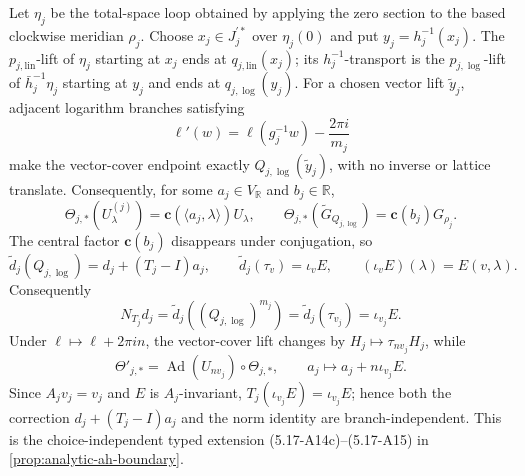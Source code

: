 \begin{auditrecord}
Let $\eta_j$ be the total-space loop obtained by applying the zero section
to the based clockwise meridian $\rho_j$.  Choose
$x_j\in J_j^{\prime *}$ over $\eta_j(0)$ and put $y_j=h_j^{-1}(x_j)$.
The $p_{j,\mathrm{lin}}$-lift of $\eta_j$ starting at $x_j$ ends at
$q_{j,\mathrm{lin}}(x_j)$; its $h_j^{-1}$-transport is the
$p_{j,\log}$-lift of $\bar h_j^{-1}\eta_j$ starting at $y_j$ and ends at
$q_{j,\log}(y_j)$.  For a chosen vector lift $\widetilde y_j$, adjacent
logarithm branches satisfying
\[
 \ell'(w)=\ell(g_j^{-1}w)-\frac{2\pi i}{m_j}
\]
make the vector-cover endpoint exactly
$Q_{j,\log}(\widetilde y_j)$, with no inverse or lattice translate.
Consequently, for some $a_j\in V_{\mathbb R}$ and $b_j\in\mathbb R$,
\[
 \Theta_{j,*}(U_\lambda^{(j)})
 =\mathbf c(\langle a_j,\lambda\rangle)U_\lambda,\qquad
 \Theta_{j,*}(\widetilde G_{Q_{j,\log}})
 =\mathbf c(b_j)G_{\rho_j}.
\]
The central factor $\mathbf c(b_j)$ disappears under conjugation, so
\[
 \widetilde d_j(Q_{j,\log})=d_j+(T_j-I)a_j,\qquad
 \widetilde d_j(\tau_v)=\iota_vE,\qquad
 (\iota_vE)(\lambda)=E(v,\lambda).
\]
Consequently
\[
 N_{T_j}d_j
 =\widetilde d_j((Q_{j,\log})^{m_j})
 =\widetilde d_j(\tau_{v_j})=\iota_{v_j}E.
\]
Under $\ell\mapsto\ell+2\pi in$, the vector-cover lift changes by
$H_j\mapsto\tau_{nv_j}H_j$, while
\[
 \Theta'_{j,*}
 =\operatorname{Ad}(U_{nv_j})\circ\Theta_{j,*},\qquad
 a_j\longmapsto a_j+n\iota_{v_j}E.
\]
Since $A_jv_j=v_j$ and $E$ is $A_j$-invariant,
$T_j(\iota_{v_j}E)=\iota_{v_j}E$; hence both the correction
$d_j+(T_j-I)a_j$ and the norm identity are branch-independent.
This is the choice-independent typed extension (5.17-A14c)--(5.17-A15) in
\cref{prop:analytic-ah-boundary}.


\end{auditrecord}
